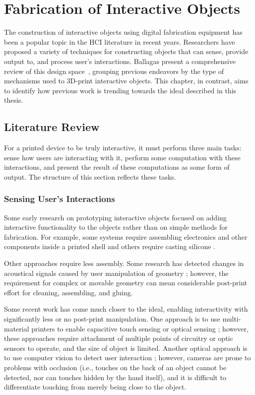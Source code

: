 \chapter{Fabrication of Interactive Objects} \label{ch:background}
  The construction of interactive objects using digital fabrication equipment
  has been a popular topic in the HCI literature in recent years. Researchers
  have proposed a variety of techniques for constructing objects that can sense,
  provide output to, and process user's interactions. Ballagas \etal present a
  comprehensive review of this design space~\cite{Ballagas:2018}, grouping
  previous endeavors by the type of mechanisms used to 3D-print interactive
  objects. This chapter, in contrast, aims to identify how previous work is
  trending towards the \pap ideal described in this thesis.

  \section{\papf Literature Review}
    For a printed device to be truly interactive, it must perform three main
    tasks: sense how users are interacting with it, perform some computation
    with these interactions, and present the result of these computations as
    some form of output. The structure of this section reflects these tasks.

    \subsection{Sensing User's Interactions} \label{sec:sensing}
      Some early research on prototyping interactive objects focused on adding
      interactive functionality to the objects rather than on simple methods for
      fabrication. For example, some systems require assembling electronics and
      other components inside a printed shell \cite{Savage:2015ws, Savage:2013,
      Murray-Smith:2008, Hook:2014kp} and others require casting silicone
      \cite{He:2017, Rod:2017}.

      Other approaches require less assembly. Some research has detected changes
      in acoustical signals caused by user manipulation of geometry
      \cite{Savage:2015, Laput:2015, Li:2016}; however, the requirement for
      complex or movable geometry can mean considerable post-print effort for
      cleaning, assembling, and gluing.

      Some recent work has come much closer to the \pap ideal, enabling
      interactivity with significantly less or no post-print manipulation. One
      approach is to use multi-material printers to enable capacitive touch
      sensing \cite{Schmitz:2015, Schmitz:2019, Gotzelmann:2016} or optical
      sensing \cite{Willis:2012}; however, these approaches require attachment
      of multiple points of circuitry or optic sensors to operate, and the size
      of object is limited. Another optical approach is to use computer vision
      to detect user interaction \cite{Shi:2016a}; however, cameras are prone to
      problems with occlusion (i.e., touches on the back of an object cannot be
      detected, nor can touches hidden by the hand itself), and it is difficult
      to differentiate touching from merely being close to the object.

